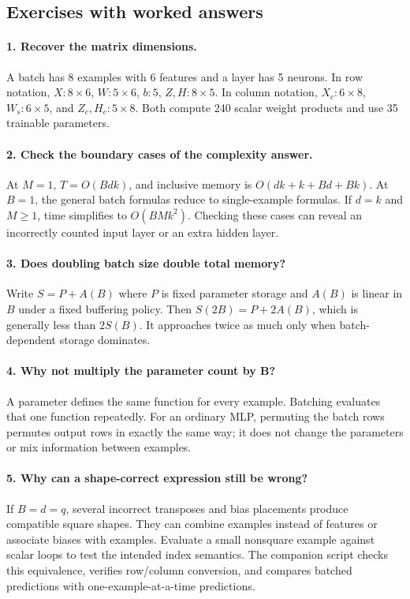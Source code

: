 \subsection{Exercises with worked answers}
\paragraph{1. Recover the matrix dimensions.}
A batch has 8 examples with 6 features and a layer has 5 neurons. In row notation,
$X:8\times6$, $W:5\times6$, $b:5$, $Z,H:8\times5$.
In column notation, $X_c:6\times8$, $W_s:6\times5$, and $Z_c,H_c:5\times8$.
Both compute 240 scalar weight products and use 35 trainable parameters.

\paragraph{2. Check the boundary cases of the complexity answer.}
At $M=1$, $T=O(Bdk)$, and inclusive memory is $O(dk+k+Bd+Bk)$. At $B=1$, the general batch formulas reduce to single-example formulas. If $d=k$ and $M\geq1$, time simplifies to $O(BMk^2)$. Checking these cases can reveal an incorrectly counted input layer or an extra hidden layer.

\paragraph{3. Does doubling batch size double total memory?}
Write $S=P+A(B)$ where $P$ is fixed parameter storage and $A(B)$ is linear in $B$ under a fixed buffering policy. Then $S(2B)=P+2A(B)$, which is generally less than $2S(B)$. It approaches twice as much only when batch-dependent storage dominates.

\paragraph{4. Why not multiply the parameter count by B?}
A parameter defines the same function for every example. Batching evaluates that one function repeatedly. For an ordinary MLP, permuting the batch rows permutes output rows in exactly the same way; it does not change the parameters or mix information between examples.

\paragraph{5. Why can a shape-correct expression still be wrong?}
If $B=d=q$, several incorrect transposes and bias placements produce compatible square shapes. They can combine examples instead of features or associate biases with examples. Evaluate a small nonsquare example against scalar loops to test the intended index semantics. The companion script checks this equivalence, verifies row/column conversion, and compares batched predictions with one-example-at-a-time predictions.

